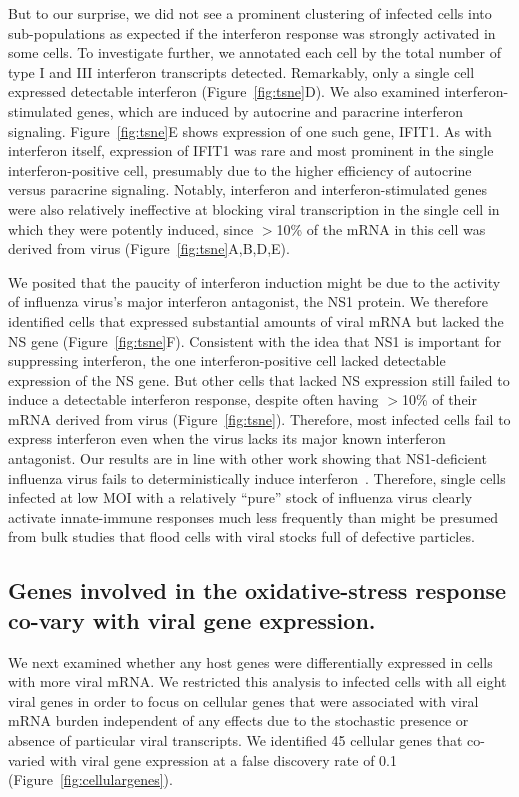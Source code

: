 \documentclass[9pt,lineno]{elife}
\begin{document}
But to our surprise, we did not see a prominent clustering of infected cells into sub-populations as expected if the interferon response was strongly activated in some cells.
To investigate further, we annotated each cell by the total number of type I and III interferon transcripts detected.
Remarkably, only a single cell expressed detectable interferon (Figure~\ref{fig:tsne}D).
We also examined interferon-stimulated genes, which are induced by autocrine and paracrine interferon signaling.
Figure~\ref{fig:tsne}E shows expression of one such gene, IFIT1.
As with interferon itself, expression of IFIT1 was rare and most prominent in the single interferon-positive cell, presumably due to the higher efficiency of autocrine versus paracrine signaling.
Notably, interferon and interferon-stimulated genes were also relatively ineffective at blocking viral transcription in the single cell in which they were potently induced, since $>$10\% of the mRNA in this cell was derived from virus (Figure~\ref{fig:tsne}A,B,D,E).

We posited that the paucity of interferon induction might be due to the activity of influenza virus's major interferon antagonist, the NS1 protein.
We therefore identified cells that expressed substantial amounts of viral mRNA but lacked the NS gene (Figure~\ref{fig:tsne}F).
Consistent with the idea that NS1 is important for suppressing interferon, the one interferon-positive cell lacked detectable expression of the NS gene.
But other cells that lacked NS expression still failed to induce a detectable interferon response, despite often having $>$10\% of their mRNA derived from virus (Figure~\ref{fig:tsne}).
Therefore, most infected cells fail to express interferon even when the virus lacks its major known interferon antagonist.
Our results are in line with other work showing that NS1-deficient influenza virus fails to deterministically induce interferon~\citep{killip2017single}.
Therefore, single cells infected at low MOI with a relatively ``pure'' stock of influenza virus clearly activate innate-immune responses much less frequently than might be presumed from bulk studies that flood cells with viral stocks full of defective particles.

\subsection{Genes involved in the oxidative-stress response co-vary with viral gene expression.}
We next examined whether any host genes were differentially expressed in cells with more viral mRNA.
We restricted this analysis to infected cells with all eight viral genes in order to focus on cellular genes that were associated with viral mRNA burden independent of any effects due to the stochastic presence or absence of particular viral transcripts.
We identified 45 cellular genes that co-varied with viral gene expression at a false discovery rate of 0.1 (Figure~\ref{fig:cellulargenes}).
\end{document}
